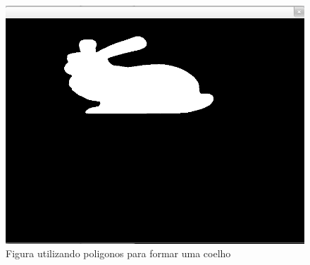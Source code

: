 \documentclass[12pt]{article}
\begin{document}
\begin{figure}[!htb]
\centering
\includegraphics[scale=0.5]{images/rabit_polygon.png}
\caption{Figura utilizando poligonos para formar uma coelho}
\end{figure}
\end{document}
